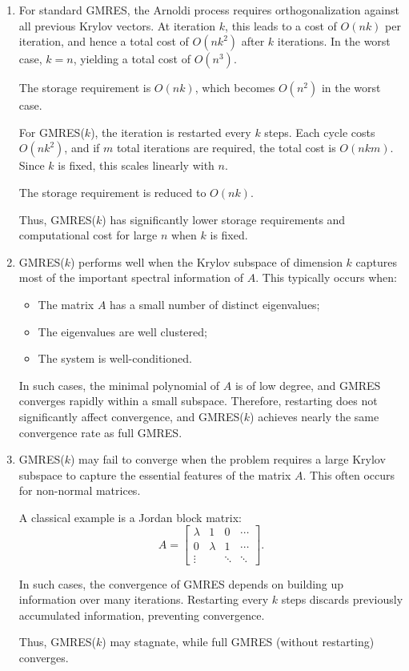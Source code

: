 \documentclass{ctexart}
\begin{document}
  \begin{solution}
    \begin{enumerate}
      \item For standard GMRES, the Arnoldi process requires orthogonalization against all previous Krylov vectors.
        At iteration $k$, this leads to a cost of $O(nk)$ per iteration, and hence a total cost of $O(nk^2)$
        after $k$ iterations. In the worst case, $k = n$, yielding a total cost of $O(n^3)$.

        The storage requirement is $O(nk)$, which becomes $O(n^2)$ in the worst case.

        For GMRES($k$), the iteration is restarted every $k$ steps. Each cycle costs $O(nk^2)$,
        and if $m$ total iterations are required, the total cost is $O(nkm)$.
        Since $k$ is fixed, this scales linearly with $n$.

        The storage requirement is reduced to $O(nk)$.

        Thus, GMRES($k$) has significantly lower storage requirements and computational cost
        for large $n$ when $k$ is fixed.
      \item GMRES($k$) performs well when the Krylov subspace of dimension $k$ captures most of
        the important spectral information of $A$. This typically occurs when:

        \begin{itemize}
          \item The matrix $A$ has a small number of distinct eigenvalues;
          \item The eigenvalues are well clustered;
          \item The system is well-conditioned.
        \end{itemize}

        In such cases, the minimal polynomial of $A$ is of low degree, and GMRES converges
        rapidly within a small subspace. Therefore, restarting does not significantly affect
        convergence, and GMRES($k$) achieves nearly the same convergence rate as full GMRES.
      \item GMRES($k$) may fail to converge when the problem requires a large Krylov subspace
        to capture the essential features of the matrix $A$. This often occurs for
        non-normal matrices.

        A classical example is a Jordan block matrix:
        \[
          A =
          \begin{bmatrix}
            \lambda & 1 & 0 & \cdots \\
            0 & \lambda & 1 & \cdots \\
            \vdots & & \ddots & \ddots
          \end{bmatrix}.
        \]

        In such cases, the convergence of GMRES depends on building up information over
        many iterations. Restarting every $k$ steps discards previously accumulated
        information, preventing convergence.

        Thus, GMRES($k$) may stagnate, while full GMRES (without restarting) converges.
    \end{enumerate}
  \end{solution}
\end{document}
